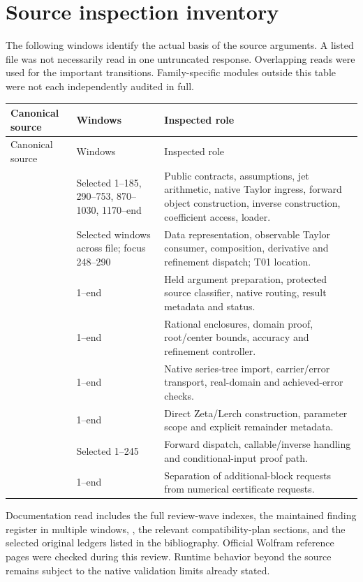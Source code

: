 \documentclass[11pt,letterpaper]{article}
\theoremstyle{definition}\newtheorem{definition}[proposition]{Definition}
\begin{document}
\section{Source inspection inventory}
The following windows identify the actual basis of the source arguments.
A listed file was not necessarily read in one untruncated response. Overlapping
reads were used for the important transitions. Family-specific modules outside
this table were not each independently audited in full.

\begin{longtable}{@{}P{2.38in}P{0.9in}P{3.02in}@{}}
\toprule
Canonical source & Windows & Inspected role\\\midrule
\endfirsthead
\toprule Canonical source & Windows & Inspected role\\\midrule
\endhead
{} & Selected 1--185, 290--753, 870--1030, 1170--end & Public contracts, assumptions, jet arithmetic, native Taylor ingress, forward object construction, inverse construction, coefficient access, loader.\\
 & Selected windows across file; focus 248--290 & Data representation, observable Taylor consumer, composition, derivative and refinement dispatch; T01 location.\\
 & 1--end & Held argument preparation, protected source classifier, native routing, result metadata and status.\\
 & 1--end & Rational enclosures, domain proof, root/center bounds, accuracy and refinement controller.\\
 & 1--end & Native series-tree import, carrier/error transport, real-domain and achieved-error checks.\\
 & 1--end & Direct Zeta/Lerch construction, parameter scope and explicit remainder metadata.\\
 & Selected 1--245 & Forward dispatch, callable/inverse handling and conditional-input proof path.\\
 & 1--end & Separation of additional-block requests from numerical certificate requests.\\
\bottomrule
\end{longtable}

Documentation read includes the full review-wave indexes, the maintained
finding register in multiple windows, , the
relevant compatibility-plan sections, and the selected original ledgers listed
in the bibliography. Official Wolfram reference pages were checked during this
review. Runtime behavior beyond the source remains subject to the native
validation limits already stated.
\end{document}
